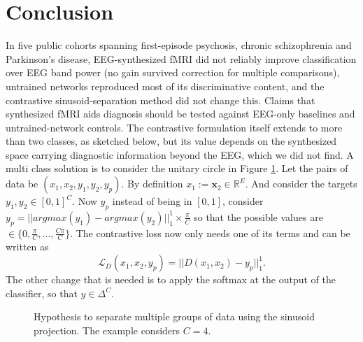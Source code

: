\documentclass{article}
\begin{document}
\section{Conclusion}\label{section:conclusion}

In five public cohorts spanning first-episode psychosis, chronic schizophrenia and Parkinson's disease, EEG-synthesized fMRI did not reliably improve classification over EEG band power (no gain survived correction for multiple comparisons), untrained networks reproduced most of its discriminative content, and the contrastive sinusoid-separation method did not change this. Claims that synthesized fMRI aids diagnosis should be tested against EEG-only baselines and untrained-network controls. The contrastive formulation itself extends to more than two classes, as sketched below, but its value depends on the synthesized space carrying diagnostic information beyond the EEG, which we did not find. A multi class solution is to consider the unitary circle in Figure \ref{future_work:fig:multi_label_sinusoid}. Let the pairs of data be $(x_1, x_2, y_1, y_2, y_p)$. By definition $x_1 := \mathbf{x}_2 \in \mathbb{R}^E$. And consider the targets $y_1, y_2 \in [0,1]^C$. Now $y_p$ instead of being in $[0,1]$, consider $y_p=||argmax(y_1) - argmax(y_2)||_1^1 \times \frac{\pi}{C}$ so that the possible values are $\in \{0,\frac{\pi}{C}, \dots, \frac{C\pi}{C}\}$. The contrastive loss now only needs one of its terms and can be written as
\begin{equation}\label{future_work:equation:multi_contrastive}
    \mathcal{L}_D(x_1, x_2, y_p) = ||D(x_1, x_2)-y_p||_1^1 .
\end{equation}
The other change that is needed is to apply the softmax at the output of the classifier, so that $y\in \Delta^C$.

\begin{figure}[ht]
    \centering
    \caption{Hypothesis to separate multiple groups of data using the sinusoid projection. The example considers $C=4$.}
    \label{future_work:fig:multi_label_sinusoid}
\end{figure}
\end{document}
